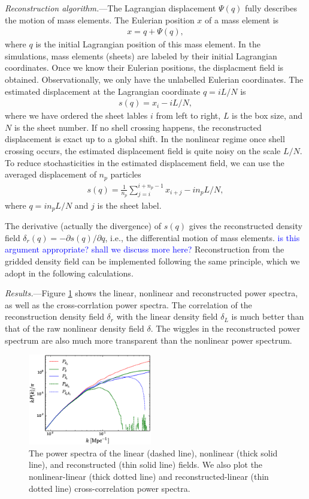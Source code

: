 \documentclass[aps,prd,twocolumn,showpacs,superscriptaddress,groupedaddress,nofootinbib]{revtex4}  %
\newcommand{\tcb}{\textcolor{blue}}
\newcommand{\bea}{\begin{eqnarray}}
\newcommand{\eea}{\end{eqnarray}}
\begin{document}
{\it Reconstruction algorithm.}---The Lagrangian displacement 
${\Psi}({q})$ fully describes the motion of mass elements.
The Eulerian position ${x}$ of a mass element is
\bea
{x}={q}+{\Psi}({q}),
\eea
where ${q}$ is the initial Lagrangian position of this mass element.
In the simulations, mass elements (sheets) are labeled by their initial 
Lagrangian coordinates. Once we know their Eulerian positions, the displacment 
field is obtained. Observationally, we only have the unlabelled Eulerian 
coordinates. 
The estimated displacement at the Lagrangian coordinate $q=iL/N$ is 
\bea
s(q)=x_i-iL/N,
\eea
where we have ordered the sheet lables $i$ from left to right, $L$ is the box
size, and $N$ is the sheet number. 
If no shell crossing happens, the reconstructed displacement is exact up to
a global shift. In the nonlinear regime once shell crossing occurs, the 
estimated displacement field is quite noisy on the scale $L/N$.
To reduce stochasticities in the estimated displacement field, we can use the
averaged displacement of $n_p$ particles 
\bea
s(q)=\frac{1}{n_p}\sum_{j=i}^{i+n_p-1}x_{i+j}-in_pL/N,
\eea
where $q=in_pL/N$ and $j$ is the sheet label. 

The derivative (actually the divergence) of $s(q)$ gives the reconstructed 
density field 
$\delta_r({q})=-\partial s(q)/\partial q$,
i.e., the differential
motion of mass elements. \tcb{is this argument appropriate? shall we discuss 
more here?}
Reconstruction from the gridded density field can be implemented following
the same principle, which we adopt in the following calculations.


{\it Results.}---Figure \ref{fig:ps} shows the linear, nonlinear and reconstructed power spectra,
as well as the cross-corrlation power spectra.
The correlation of the reconstruction density field $\delta_r$ with the linear
density field $\delta_L$ is much better than that of the raw nonlinear density 
field $\delta$. The wiggles in the reconstructed power spectrum are also much 
more transparent than the nonlinear power spectrum.

\begin{figure}[tbp]
\begin{center}
\includegraphics[width=0.48\textwidth]{f3x.eps}
\end{center}
\vspace{-0.7cm}
\caption{The power spectra of the linear (dashed line), nonlinear (thick solid
line), and reconstructed (thin solid line) fields. 
We also plot the nonlinear-linear (thick dotted line) and 
reconstructed-linear (thin dotted line) cross-correlation power spectra.}
\label{fig:ps}
\end{figure}
\end{document}
